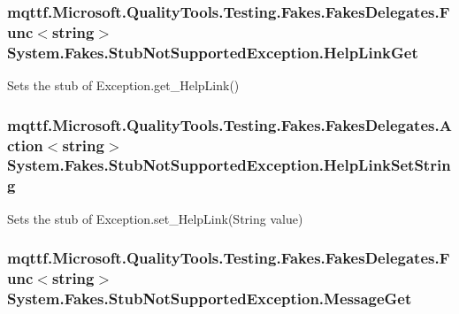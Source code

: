 \hypertarget{class_system_1_1_fakes_1_1_stub_not_supported_exception_adfd5d27267f753f3673e61513c3c6c43}{
\subsubsection[{Help\-Link\-Get}]{\setlength{\rightskip}{0pt plus 5cm}mqttf.\-Microsoft.\-Quality\-Tools.\-Testing.\-Fakes.\-Fakes\-Delegates.\-Func$<$string$>$ System.\-Fakes.\-Stub\-Not\-Supported\-Exception.\-Help\-Link\-Get}}\label{class_system_1_1_fakes_1_1_stub_not_supported_exception_adfd5d27267f753f3673e61513c3c6c43}


Sets the stub of Exception.\-get\-\_\-\-Help\-Link()

\hypertarget{class_system_1_1_fakes_1_1_stub_not_supported_exception_a15204842beb341f4f42d274a5d238098}{
\subsubsection[{Help\-Link\-Set\-String}]{\setlength{\rightskip}{0pt plus 5cm}mqttf.\-Microsoft.\-Quality\-Tools.\-Testing.\-Fakes.\-Fakes\-Delegates.\-Action$<$string$>$ System.\-Fakes.\-Stub\-Not\-Supported\-Exception.\-Help\-Link\-Set\-String}}\label{class_system_1_1_fakes_1_1_stub_not_supported_exception_a15204842beb341f4f42d274a5d238098}


Sets the stub of Exception.\-set\-\_\-\-Help\-Link(\-String value)

\hypertarget{class_system_1_1_fakes_1_1_stub_not_supported_exception_acf0c7c50d18421a22bcde685699713c5}{
\subsubsection[{Message\-Get}]{\setlength{\rightskip}{0pt plus 5cm}mqttf.\-Microsoft.\-Quality\-Tools.\-Testing.\-Fakes.\-Fakes\-Delegates.\-Func$<$string$>$ System.\-Fakes.\-Stub\-Not\-Supported\-Exception.\-Message\-Get}}\label{class_system_1_1_fakes_1_1_stub_not_supported_exception_acf0c7c50d18421a22bcde685699713c5}


